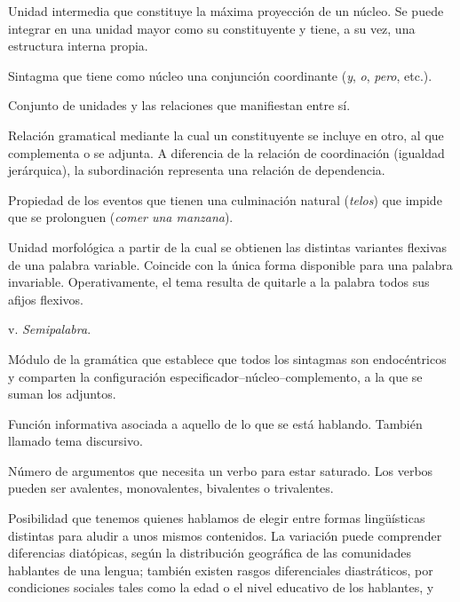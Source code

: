 \begin{glosariogeneral}
  \item[Sintagma:] Unidad intermedia que constituye la máxima proyección de un
        núcleo. Se puede integrar en una unidad mayor como su constituyente y
        tiene, a su vez, una estructura interna propia.
  \item[Sintagma de conjunción:] Sintagma que tiene como núcleo una conjunción
        coordinante (\textit{y}, \textit{o}, \textit{pero}, etc.).
  \item[Sistema:] Conjunto de unidades y las relaciones que manifiestan entre
        sí.
  \item[Subordinación:] Relación gramatical mediante la cual un constituyente se
        incluye en otro, al que complementa o se adjunta. A diferencia de la
        relación de coordinación (igualdad jerárquica), la subordinación
        representa una relación de dependencia.
  \item[Telicidad:] Propiedad de los eventos que tienen una culminación
        natural (\textit{telos}) que impide que se prolonguen (\textit{comer una
        manzana}).
  \item[Tema:] Unidad morfológica a partir de la cual se obtienen las distintas
        variantes flexivas de una palabra variable. Coincide con la única forma
        disponible para una palabra invariable. Operativamente, el tema resulta
        de quitarle a la palabra todos sus afijos flexivos.
  \item[Tema culto:] v. \textit{Semipalabra}.
  \item[Teoría X\prima:] Módulo de la gramática que establece que todos los
        sintagmas son endocéntricos y comparten la configuración
        especificador--núcleo--complemento, a la que se suman los adjuntos.
  \item[Tópico:] Función informativa asociada a aquello de lo que se está
        hablando. También llamado tema discursivo.
  \item[Valencia verbal:] Número de argumentos que necesita un verbo para
        estar saturado. Los verbos pueden ser avalentes, monovalentes,
        bivalentes o trivalentes.
  \item[Variación:] Posibilidad que tenemos quienes hablamos de elegir entre
        formas lingüísticas distintas para aludir a unos mismos contenidos. La
        variación puede comprender diferencias diatópicas, según la
        distribución geográfica de las comunidades hablantes de una lengua;
        también existen rasgos diferenciales diastráticos, por condiciones
        sociales tales como la edad o el nivel educativo de los hablantes, y

\end{glosariogeneral}
